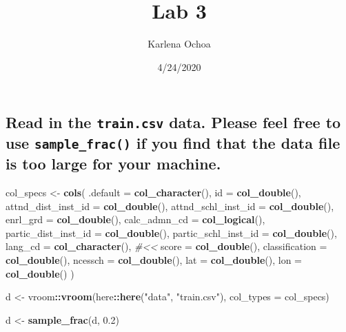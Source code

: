 \documentclass[
]{article}
\title{Lab 3}
\author{Karlena Ochoa}
\date{4/24/2020}
\newenvironment{Shaded}{\begin{snugshade}}{\end{snugshade}}
\newcommand{\CommentTok}[1]{\textcolor[rgb]{0.56,0.35,0.01}{\textit{#1}}}
\newcommand{\DataTypeTok}[1]{\textcolor[rgb]{0.13,0.29,0.53}{#1}}
\newcommand{\FloatTok}[1]{\textcolor[rgb]{0.00,0.00,0.81}{#1}}
\newcommand{\KeywordTok}[1]{\textcolor[rgb]{0.13,0.29,0.53}{\textbf{#1}}}
\newcommand{\NormalTok}[1]{#1}
\newcommand{\OperatorTok}[1]{\textcolor[rgb]{0.81,0.36,0.00}{\textbf{#1}}}
\newcommand{\StringTok}[1]{\textcolor[rgb]{0.31,0.60,0.02}{#1}}
\begin{document}
\maketitle

\hypertarget{read-in-the-train.csv-data.-please-feel-free-to-use-sample_frac-if-you-find-that-the-data-file-is-too-large-for-your-machine.}{%
\subsection{\texorpdfstring{Read in the \texttt{train.csv} data. Please
feel free to use \texttt{sample\_frac()} if you find that the data file
is too large for your
machine.}{Read in the train.csv data. Please feel free to use sample\_frac() if you find that the data file is too large for your machine.}}\label{read-in-the-train.csv-data.-please-feel-free-to-use-sample_frac-if-you-find-that-the-data-file-is-too-large-for-your-machine.}}

\begin{Shaded}
\begin{Highlighting}[]
\NormalTok{col_specs <-}\StringTok{ }\KeywordTok{cols}\NormalTok{(}
  \DataTypeTok{.default =} \KeywordTok{col_character}\NormalTok{(),}
  \DataTypeTok{id =} \KeywordTok{col_double}\NormalTok{(),}
  \DataTypeTok{attnd_dist_inst_id =} \KeywordTok{col_double}\NormalTok{(),}
  \DataTypeTok{attnd_schl_inst_id =} \KeywordTok{col_double}\NormalTok{(),}
  \DataTypeTok{enrl_grd =} \KeywordTok{col_double}\NormalTok{(),}
  \DataTypeTok{calc_admn_cd =} \KeywordTok{col_logical}\NormalTok{(),}
  \DataTypeTok{partic_dist_inst_id =} \KeywordTok{col_double}\NormalTok{(),}
  \DataTypeTok{partic_schl_inst_id =} \KeywordTok{col_double}\NormalTok{(),}
  \DataTypeTok{lang_cd =} \KeywordTok{col_character}\NormalTok{(), }\CommentTok{#<<}
  \DataTypeTok{score =} \KeywordTok{col_double}\NormalTok{(),}
  \DataTypeTok{classification =} \KeywordTok{col_double}\NormalTok{(),}
  \DataTypeTok{ncessch =} \KeywordTok{col_double}\NormalTok{(),}
  \DataTypeTok{lat =} \KeywordTok{col_double}\NormalTok{(),}
  \DataTypeTok{lon =} \KeywordTok{col_double}\NormalTok{()}
\NormalTok{)}

\NormalTok{d <-}\StringTok{ }\NormalTok{vroom}\OperatorTok{::}\KeywordTok{vroom}\NormalTok{(here}\OperatorTok{::}\KeywordTok{here}\NormalTok{(}\StringTok{"data"}\NormalTok{, }\StringTok{"train.csv"}\NormalTok{),}
                  \DataTypeTok{col_types =}\NormalTok{ col_specs)}

\NormalTok{d <-}\StringTok{ }\KeywordTok{sample_frac}\NormalTok{(d, }\FloatTok{0.2}\NormalTok{)}
\end{Highlighting}
\end{Shaded}
\end{document}
